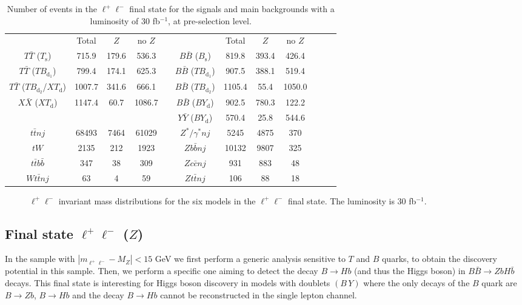 \documentclass[12pt,a4paper]{article}
\newcommand{\TT}{T \bar T}
\newcommand{\BB}{B \bar B}
\newcommand{\XX}{X \bar X}
\newcommand{\YY}{Y \bar Y}
\newcommand{\Ts}{T_\text{s}}
\newcommand{\Bs}{B_\text{s}}
\newcommand{\TBd}{TB_{\text{d}_1}}
\newcommand{\TBD}{TB_{\text{d}_2}}
\newcommand{\XTd}{XT_\text{d}}
\newcommand{\BYd}{BY_\text{d}}
\begin{document}
%
\begin{table}[htb]
\begin{center}
\begin{tabular}{cccccccccccc}
                 & Total  & $Z$   & no $Z$ & \quad &          & Total & $Z$   & no $Z$ \\[1mm]
$\TT$ ($\Ts$)    & 715.9  & 179.6 & 536.3  & & $\BB$ ($\Bs$)  & 819.8 & 393.4 & 426.4  \\
$\TT$ ($\TBd$)   & 799.4  & 174.1 & 625.3  & & $\BB$ ($\TBd$) & 907.5 & 388.1 & 519.4 \\
$\TT$ ($\TBD$/$\XTd$)   & 1007.7 & 341.6 & 666.1  & & $\BB$ ($\TBD$) & 1105.4 & 55.4 & 1050.0 \\
$\XX$ ($\XTd$)   & 1147.4 & 60.7  & 1086.7 & & $\BB$ ($\BYd$) & 902.5 & 780.3 & 122.2 \\
                 &        &       &        & & $\YY$ ($\BYd$) & 570.4 & 25.8  & 544.6 \\
\hline
$t \bar t nj$    & 68493  & 7464  & 61029  & & $Z^*/\gamma^*nj$ & 5245   & 4875  & 370 \\
$tW$             & 2135   & 212   & 1923   & & $Zb\bar b nj$  & 10132 & 9807  & 325 \\
$t\bar tb\bar b$ & 347    & 38    & 309    & & $Zc \bar c nj$ & 931   & 883   & 48 \\
$Wt \bar t nj$   & 63     & 4     & 59     & & $Zt \bar t nj$ & 106   & 88    & 18 
\end{tabular}
\end{center}
\caption{Number of events in the $\ell^+ \ell^-$ final state for
the signals and main backgrounds with a luminosity of 30 fb$^{-1}$, at pre-selection level.}
\label{tab:nsnb-2Q0}
\end{table}
%
%
\begin{figure}[htb]
\begin{center}
\caption{$\ell^+ \ell^-$ invariant mass distributions for the six models in the $\ell^+ \ell^-$ final state. The luminosity is 30 fb$^{-1}$.}
\label{fig:mZrec-2Q0}
\end{center}
\end{figure}
%




\subsection{Final state $\ell^+ \ell^-$ ($Z$)}


In the sample with $|m_{\ell^+ \ell^-}-M_Z| < 15$ GeV we first perform a generic analysis sensitive to $T$ and $B$ quarks, to obtain the discovery potential in this sample. Then, we perform a specific one aiming to detect the decay $B \to Hb$ (and thus the Higgs boson) in $\BB \to ZbH \bar b$ decays. This final state is interesting for Higgs boson discovery in models with doublets $(B \, Y)$ where the only decays of the $B$ quark are $B \to Zb$, $B \to Hb$ and the decay $B \to Hb$ cannot be reconstructed in the single lepton channel.
\end{document}

